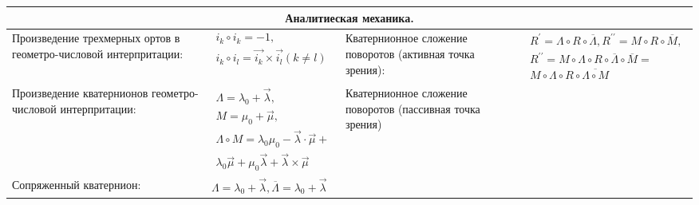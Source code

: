 \documentclass{article}
\begin{document}
\begin{tabular}{ |p{3.8cm}|p{5.7cm}|p{3.8cm}|p{5.7cm}|  }
\hline
\multicolumn{4}{|c|}{Аналитиеская механика.} \\
\hline
Произведение трехмерных ортов в геометро-числовой интерпритации:             &  %
$\begin{aligned}
i_k \circ i_k = -1,                      \\
i_k \circ i_l = \vec{i_k} \times \vec{i_l} (k \neq l)
\end{aligned}$                                                               &  %
Кватернионное сложение поворотов (активная точка зрения):                    &  %
$\begin{aligned}
R^\prime = \Lambda \circ R \circ \overline{\Lambda},
R^{\prime\prime} = M \circ R \circ \overline{M},                       \\
R^{\prime\prime} =
 M \circ \Lambda \circ R \circ \overline{\Lambda} \circ \overline{M} = \\
 M \circ \Lambda \circ R \circ \overline{\Lambda \circ M}
\end{aligned}$                                                               \\ %
\hline
Произведение кватернионов геометро-числовой интерпритации:                   &  %
$\begin{aligned}
\Lambda = \lambda_0 + \vec{\lambda},              \\
M = \mu_0 + \vec{\mu},                            \\
\Lambda \circ M =
\lambda_0 \mu_0 - \vec{\lambda} \cdot \vec{\mu} + \\
\lambda_0 \vec{\mu} +
\mu_0 \vec{\lambda} + \vec{\lambda} \times \vec{\mu}
\end{aligned}$                                                               &  %
Кватернионное сложение поворотов (пассивная точка зрения)                    &  %
                                                                             \\ %
\hline
Сопряженный кватернион:                                                      &  %
$\Lambda = \lambda_0 + \vec{\lambda},
 \overline{\Lambda} = \lambda_0 + \vec{\lambda}$                             &  %
                                                                             &  %
                                                                             \\ %
\hline

\end{tabular}
\end{document}
